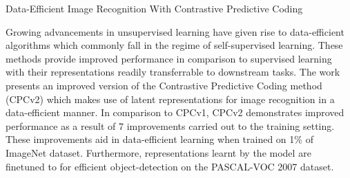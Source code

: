 \documentclass[12pt,letterpaper]{article}
\begin{document}
\begin{center}
  \large{Data-Efficient Image Recognition With Contrastive Predictive Coding}
\end{center}


Growing advancements in unsupervised learning have given rise to data-efficient algorithms which commonly fall in the regime of self-supervised learning. These methods provide improved performance in comparison to supervised learning with their representations readily transferrable to downstream tasks. The work presents an improved version of the Contrastive Predictive Coding method (CPCv2) which makes use of latent representations for image recognition in a data-efficient manner. In comparison to CPCv1, CPCv2 demonstrates improved performance as a result of 7 improvements carried out to the training setting. These improvements aid in data-efficient learning when trained on 1\% of ImageNet dataset. Furthermore, representations learnt by the model are finetuned to for efficient object-detection on the PASCAL-VOC 2007 dataset.
\end{document}
